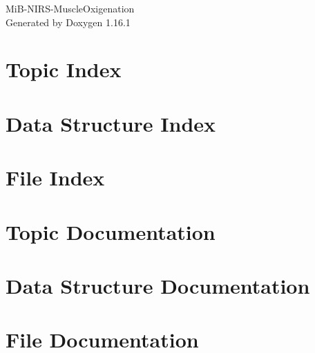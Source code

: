 \documentclass[twoside]{book}
\newcommand{\+}{\discretionary{\mbox{\scriptsize$\hookleftarrow$}}{}{}}
\newcommand{\clearemptydoublepage}{%
    \newpage{\pagestyle{empty}\cleardoublepage}%
  }
\begin{document}
  \raggedbottom
    \hypersetup{pageanchor=false,
                bookmarksnumbered=true,
                pdfencoding=unicode
               }
  \begin{titlepage}
  \vspace*{7cm}
  \begin{center}%
  {\Large Mi\+B-\/\+NIRS-\/\+Muscle\+Oxigenation}\\
  \vspace*{1cm}
  {\large Generated by Doxygen 1.16.1}\\
  \end{center}
  \end{titlepage}
  \clearemptydoublepage
  \tableofcontents
  \clearemptydoublepage
  \hypersetup{pageanchor=true}

\chapter{Topic Index}

\chapter{Data Structure Index}

\chapter{File Index}

\chapter{Topic Documentation}

\chapter{Data Structure Documentation}






\chapter{File Documentation}

























\end{document}
